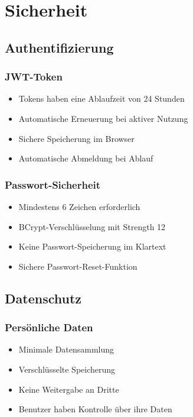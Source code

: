 \documentclass[a4paper,12pt]{article}
\begin{document}
\section{Sicherheit}

\subsection{Authentifizierung}

\subsubsection{JWT-Token}
\begin{itemize}
    \item Tokens haben eine Ablaufzeit von 24 Stunden
    \item Automatische Erneuerung bei aktiver Nutzung
    \item Sichere Speicherung im Browser
    \item Automatische Abmeldung bei Ablauf
\end{itemize}

\subsubsection{Passwort-Sicherheit}
\begin{itemize}
    \item Mindestens 6 Zeichen erforderlich
    \item BCrypt-Verschlüsselung mit Strength 12
    \item Keine Passwort-Speicherung im Klartext
    \item Sichere Passwort-Reset-Funktion
\end{itemize}

\subsection{Datenschutz}

\subsubsection{Persönliche Daten}
\begin{itemize}
    \item Minimale Datensammlung
    \item Verschlüsselte Speicherung
    \item Keine Weitergabe an Dritte
    \item Benutzer haben Kontrolle über ihre Daten
\end{itemize}
\end{document}
